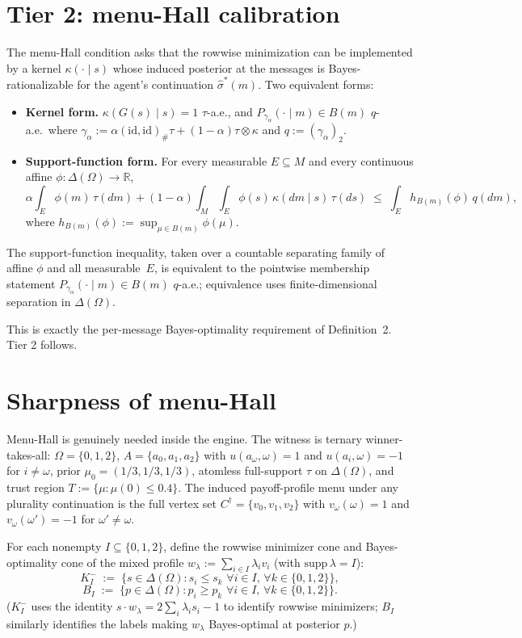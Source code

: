 \documentclass[11pt]{article}
\theoremstyle{definition}
\theoremstyle{remark}
\newcommand{\R}{\mathbb{R}}
\newcommand{\Om}{\Omega}
\begin{document}
\section{Tier 2: menu-Hall calibration}\label{sec:tier2}

The menu-Hall condition asks that the rowwise minimization can be
implemented by a kernel $\kappa(\cdot\mid s)$ whose induced posterior
at the messages is Bayes-rationalizable for the agent's continuation
$\hat\sigma^*(m)$. Two equivalent forms:
\begin{itemize}[leftmargin=2em]
\item \textbf{Kernel form.} $\kappa(G(s)\mid s) = 1$ $\tau$-a.e., and
$P_{\gamma_\alpha}(\cdot\mid m)\in B(m)$ $q$-a.e.\ where
$\gamma_\alpha := \alpha(\mathrm{id},\mathrm{id})_\#\tau + (1-\alpha)\tau\otimes\kappa$
and $q := (\gamma_\alpha)_2$.
\item \textbf{Support-function form.} For every measurable $E\subseteq M$
and every continuous affine $\phi:\Delta(\Om)\to\R$,
\[
  \alpha\!\int_E\phi(m)\,\tau(dm) + (1-\alpha)\!\int_M\!\!\int_E\phi(s)\,\kappa(dm\mid s)\,\tau(ds) \;\le\; \int_E h_{B(m)}(\phi)\,q(dm),
\]
where $h_{B(m)}(\phi) := \sup_{\mu\in B(m)}\phi(\mu)$.
\end{itemize}
The support-function inequality, taken over a countable separating
family of affine $\phi$ and all measurable~$E$, is equivalent to the
pointwise membership statement $P_{\gamma_\alpha}(\cdot\mid m)\in B(m)$
$q$-a.e.; equivalence uses finite-dimensional separation in
$\Delta(\Om)$.

This is exactly the per-message Bayes-optimality requirement of
Definition~2. Tier 2 follows.

\section{Sharpness of menu-Hall}\label{sec:tight}

Menu-Hall is genuinely needed inside the engine. The witness is
ternary winner-takes-all: $\Om = \{0,1,2\}$, $A = \{a_0,a_1,a_2\}$
with $u(a_\omega,\omega) = 1$ and $u(a_i,\omega) = -1$ for
$i\ne\omega$, prior $\mu_0 = (1/3,1/3,1/3)$, atomless full-support
$\tau$ on $\Delta(\Om)$, and trust region
$T := \{\mu : \mu(0)\le 0.4\}$. The induced payoff-profile menu under
any plurality continuation is the full vertex set $C^\dagger = \{v_0,
v_1, v_2\}$ with $v_\omega(\omega) = 1$ and $v_\omega(\omega') = -1$
for $\omega'\ne\omega$.

For each nonempty $I \subseteq \{0,1,2\}$, define the rowwise
minimizer cone and Bayes-optimality cone of the mixed profile
$w_\lambda := \sum_{i\in I}\lambda_i v_i$ (with $\mathrm{supp}\,\lambda = I$):
\[
  K_I^- \;:=\; \{s\in\Delta(\Om) : s_i\le s_k\,\,\forall i\in I,\,\forall k\in\{0,1,2\}\},
\]
\[
  B_I \;:=\; \{p\in\Delta(\Om) : p_i\ge p_k\,\,\forall i\in I,\,\forall k\in\{0,1,2\}\}.
\]
($K_I^-$ uses the identity $s\cdot w_\lambda = 2\sum_i\lambda_i s_i - 1$
to identify rowwise minimizers; $B_I$ similarly identifies the labels
making $w_\lambda$ Bayes-optimal at posterior $p$.)
\end{document}
